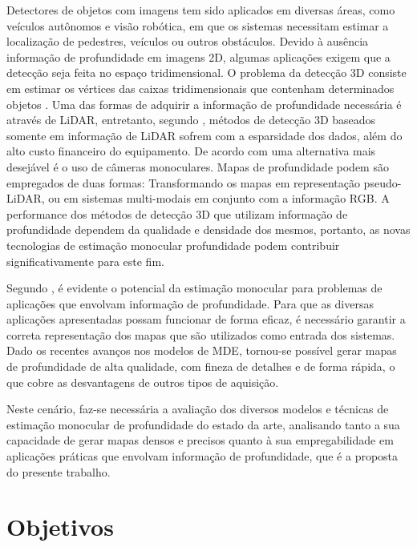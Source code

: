 Detectores de objetos com imagens tem sido aplicados em diversas áreas, como veículos autônomos e visão robótica, em que os sistemas necessitam estimar a localização de pedestres, veículos ou outros obstáculos. Devido à ausência informação de profundidade em imagens 2D, algumas aplicações exigem que a detecção seja feita no espaço tridimensional. O problema da detecção 3D consiste em estimar os vértices das caixas tridimensionais que contenham determinados objetos \cite{hu2022detection}. Uma das formas de adquirir a informação de profundidade necessária é através de LiDAR, entretanto, segundo , métodos de detecção 3D baseados somente em informação de LiDAR sofrem com a esparsidade dos dados, além do alto custo financeiro do equipamento. De acordo com  uma alternativa mais desejável é o uso de câmeras monoculares. Mapas de profundidade podem são empregados de duas formas: Transformando os mapas em representação pseudo-LiDAR, ou em sistemas multi-modais em conjunto com a informação RGB. A performance dos métodos de detecção 3D que utilizam informação de profundidade dependem da qualidade e densidade dos mesmos, portanto, as novas tecnologias de estimação monocular profundidade podem contribuir significativamente para este fim.






Segundo , é evidente o potencial da estimação monocular para problemas de aplicações que envolvam informação de profundidade. Para que as diversas aplicações apresentadas possam funcionar de forma eficaz, é necessário garantir a correta representação dos mapas que são utilizados como entrada dos sistemas. Dado os recentes avanços nos modelos de MDE, tornou-se possível gerar mapas de profundidade de alta qualidade, com fineza de detalhes e de forma rápida, o que cobre as desvantagens de outros tipos de aquisição. 

Neste cenário, faz-se necessária a avaliação dos diversos modelos e técnicas de estimação monocular de profundidade do estado da arte, analisando tanto a sua capacidade de gerar mapas densos e precisos quanto à sua empregabilidade em aplicações práticas que envolvam informação de profundidade, que é a proposta do presente trabalho.

 
\section{Objetivos}


